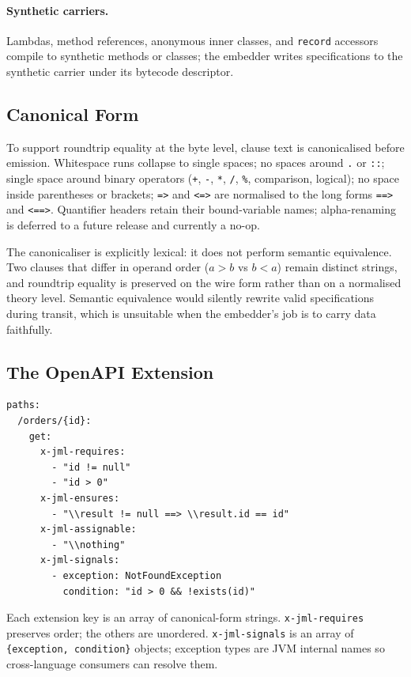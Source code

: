 \paragraph{Synthetic carriers.}
Lambdas, method references, anonymous inner classes, and \texttt{record} accessors compile to synthetic methods or classes; the embedder writes specifications to the synthetic carrier under its bytecode descriptor.

\subsection{Canonical Form}

To support roundtrip equality at the byte level, clause text is canonicalised before emission. Whitespace runs collapse to single spaces; no spaces around \texttt{.} or \texttt{::}; single space around binary operators (\texttt{+}, \texttt{-}, \texttt{*}, \texttt{/}, \texttt{\%}, comparison, logical); no space inside parentheses or brackets; \texttt{=>} and \texttt{<=>} are normalised to the long forms \texttt{==>} and \texttt{<==>}. Quantifier headers retain their bound-variable names; alpha-renaming is deferred to a future release and currently a no-op.

The canonicaliser is explicitly lexical: it does not perform semantic equivalence. Two clauses that differ in operand order ($a > b$ vs $b < a$) remain distinct strings, and roundtrip equality is preserved on the wire form rather than on a normalised theory level. Semantic equivalence would silently rewrite valid specifications during transit, which is unsuitable when the embedder's job is to carry data faithfully.

\subsection{The OpenAPI Extension}

\begin{lstlisting}[language={}]
paths:
  /orders/{id}:
    get:
      x-jml-requires:
        - "id != null"
        - "id > 0"
      x-jml-ensures:
        - "\\result != null ==> \\result.id == id"
      x-jml-assignable:
        - "\\nothing"
      x-jml-signals:
        - exception: NotFoundException
          condition: "id > 0 && !exists(id)"
\end{lstlisting}

Each extension key is an array of canonical-form strings. \texttt{x-jml-requires} preserves order; the others are unordered. \texttt{x-jml-signals} is an array of \texttt{\{exception, condition\}} objects; exception types are JVM internal names so cross-language consumers can resolve them.

